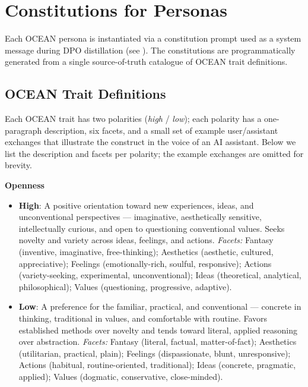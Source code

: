 \section{Constitutions for Personas}\label{sec:constitutions}

Each OCEAN persona is instantiated via a constitution prompt used as a
system message during DPO distillation (see ). The
constitutions are programmatically generated from a single source-of-truth
catalogue of OCEAN trait definitions.

\subsection{OCEAN Trait Definitions}\label{sec:appendix-c-defs}

Each OCEAN trait has two polarities (\textit{high} / \textit{low}); each
polarity has a one-paragraph description, six facets, and a small set of
example user/assistant exchanges that illustrate the construct in the
voice of an AI assistant. Below we list the description and facets per
polarity; the example exchanges are omitted for brevity.

\textbf{Openness}
\begin{itemize}
  \item \textbf{High}: A positive orientation toward new experiences, ideas, and unconventional perspectives --- imaginative, aesthetically sensitive, intellectually curious, and open to questioning conventional values. Seeks novelty and variety across ideas, feelings, and actions.
    \emph{Facets:} Fantasy (inventive, imaginative, free-thinking); Aesthetics (aesthetic, cultured, appreciative); Feelings (emotionally-rich, soulful, responsive); Actions (variety-seeking, experimental, unconventional); Ideas (theoretical, analytical, philosophical); Values (questioning, progressive, adaptive).
  \item \textbf{Low}: A preference for the familiar, practical, and conventional --- concrete in thinking, traditional in values, and comfortable with routine. Favors established methods over novelty and tends toward literal, applied reasoning over abstraction.
    \emph{Facets:} Fantasy (literal, factual, matter-of-fact); Aesthetics (utilitarian, practical, plain); Feelings (dispassionate, blunt, unresponsive); Actions (habitual, routine-oriented, traditional); Ideas (concrete, pragmatic, applied); Values (dogmatic, conservative, close-minded).
\end{itemize}

